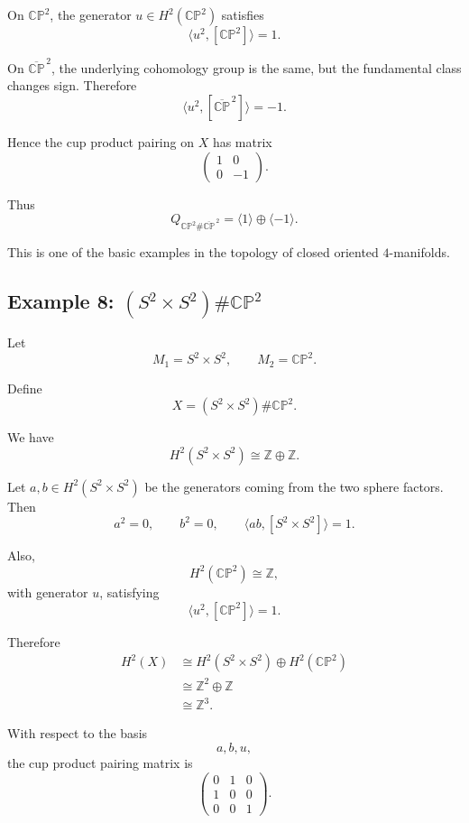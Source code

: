 \documentclass[12pt,a4paper]{article}
\theoremstyle{notespace}
\begin{document}
On \(\mathbb{CP}^2\), the generator \(u\in H^2(\mathbb{CP}^2)\) satisfies
\[
\langle u^2,[\mathbb{CP}^2]\rangle=1.
\]

On \(\overline{\mathbb{CP}}^{\,2}\), the underlying cohomology group is the
same, but the fundamental class changes sign. Therefore
\[
\langle u^2,[\overline{\mathbb{CP}}^{\,2}]\rangle=-1.
\]

Hence the cup product pairing on \(X\) has matrix
\[
\begin{pmatrix}
	1 & 0\\
	0 & -1
\end{pmatrix}.
\]

Thus
\[
\boxed{
	Q_{\mathbb{CP}^2\#\overline{\mathbb{CP}}^{\,2}}
	=
	\langle 1\rangle\oplus \langle -1\rangle.
}
\]

This is one of the basic examples in the topology of closed oriented
\(4\)-manifolds.

\subsection{Example 8: \texorpdfstring{$(S^2\times S^2)\#\mathbb{CP}^2$}{S2xS2 connected sum CP2}}

Let
\[
M_1=S^2\times S^2,
\qquad
M_2=\mathbb{CP}^2.
\]

Define
\[
X=(S^2\times S^2)\#\mathbb{CP}^2.
\]

We have
\[
H^2(S^2\times S^2)
\cong
\mathbb{Z}\oplus \mathbb{Z}.
\]

Let \(a,b\in H^2(S^2\times S^2)\) be the generators coming from the two
sphere factors. Then
\[
a^2=0,
\qquad
b^2=0,
\qquad
\langle ab,[S^2\times S^2]\rangle=1.
\]

Also,
\[
H^2(\mathbb{CP}^2)\cong \mathbb{Z},
\]
with generator \(u\), satisfying
\[
\langle u^2,[\mathbb{CP}^2]\rangle=1.
\]

Therefore
\[
\begin{aligned}
	H^2(X)
	&\cong
	H^2(S^2\times S^2)\oplus H^2(\mathbb{CP}^2) \\
	&\cong
	\mathbb{Z}^2\oplus \mathbb{Z} \\
	&\cong
	\mathbb{Z}^3.
\end{aligned}
\]

With respect to the basis
\[
a,b,u,
\]
the cup product pairing matrix is
\[
\begin{pmatrix}
	0 & 1 & 0\\
	1 & 0 & 0\\
	0 & 0 & 1
\end{pmatrix}.
\]
\end{document}

